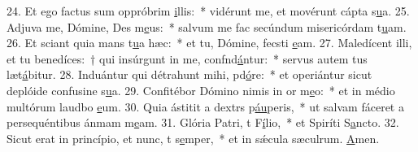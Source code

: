 24. Et ego factus sum oppróbrim \uline{i}llis:~* vidérunt me, et movérunt cápta s\uline{u}a.
25. Adjuva me, Dómine, Des m\uline{e}us:~* salvum me fac secúndum misericórdam t\uline{u}am.
26. Et sciant quia mans t\uline{u}a hæc:~* et tu, Dómine, fecsti \uline{e}am.
27. Maledícent illi, et tu benedíces:~† qui insúrgunt in me, confnd\uline{á}ntur:~* servus autem tus læt\uline{á}bitur.
28. Induántur qui détrahunt mihi, pd\uline{ó}re:~* et operiántur sicut deplóide confusine s\uline{u}a.
29. Confitébor Dómino nimis in or m\uline{e}o:~* et in médio multórum laudbo \uline{e}um.
30. Quia ástitit a dextrs p\uline{áu}peris,~* ut salvam fáceret a persequéntibus ánmam m\uline{e}am.
31. Glória Patri, t F\uline{í}lio,~* et Spiríti S\uline{a}ncto.
32. Sicut erat in princípio, et nunc, t s\uline{e}mper,~* et in sǽcula sæculrum. \uline{A}men.
